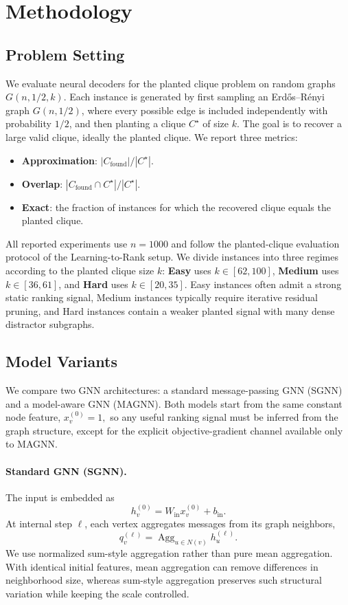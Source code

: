 \section{Methodology}

\subsection{Problem Setting}

We evaluate neural decoders for the planted clique problem on random graphs $G(n,1/2,k)$. Each instance is generated by first sampling an Erd\H{o}s--R\'{e}nyi graph $G(n,1/2)$, where every possible edge is included independently with probability $1/2$, and then planting a clique $C^\star$ of size $k$. The goal is to recover a large valid clique, ideally the planted clique. We report three metrics:
\begin{itemize}
  \item \textbf{Approximation}: $|C_{\mathrm{found}}|/|C^\star|$.
  \item \textbf{Overlap}: $|C_{\mathrm{found}}\cap C^\star|/|C^\star|$.
  \item \textbf{Exact}: the fraction of instances for which the recovered clique equals the planted clique.
\end{itemize}

All reported experiments use $n=1000$ and follow the planted-clique evaluation protocol of the Learning-to-Rank setup. We divide instances into three regimes according to the planted clique size $k$: \textbf{Easy} uses $k\in[62,100]$, \textbf{Medium} uses $k\in[36,61]$, and \textbf{Hard} uses $k\in[20,35]$. Easy instances often admit a strong static ranking signal, Medium instances typically require iterative residual pruning, and Hard instances contain a weaker planted signal with many dense distractor subgraphs.

\subsection{Model Variants}

We compare two GNN architectures: a standard message-passing GNN (SGNN) and a model-aware GNN (MAGNN). Both models start from the same constant node feature,
$
x_v^{(0)}=1,
$
so any useful ranking signal must be inferred from the graph structure, except for the explicit objective-gradient channel available only to MAGNN.

\paragraph{Standard GNN (SGNN).}
The input is embedded as
\[
  h_v^{(0)} = W_{\mathrm{in}}x_v^{(0)} + b_{\mathrm{in}} .
\]
At internal step $\ell$, each vertex aggregates messages from its graph neighbors,
\[
  q_v^{(\ell)}
  =
  \operatorname{Agg}_{u\in N(v)} h_u^{(\ell)} .
\]
We use normalized sum-style aggregation rather than pure mean aggregation. With identical initial features, mean aggregation can remove differences in neighborhood size, whereas sum-style aggregation preserves such structural variation while keeping the scale controlled.

